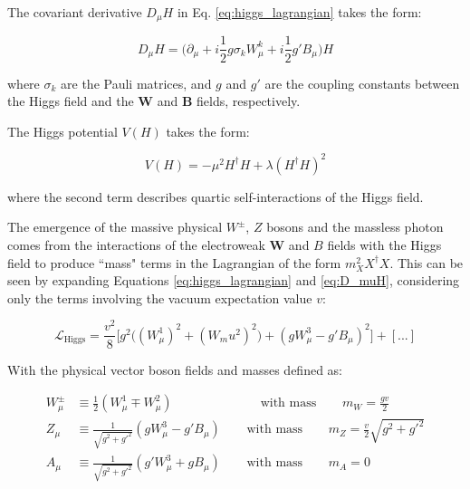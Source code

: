 The covariant derivative \(D_\mu H\) in Eq. \ref{eq:higgs_lagrangian} takes the form:

\begin{equation}
\label{eq:D_muH}
D_\mu H = \big(\partial_\mu + i\frac{1}{2}g\sigma_k W^k_\mu+i\frac{1}{2}g'B_\mu\big)H
\end{equation}

\noindent where \(\sigma_k\) are the Pauli matrices, and \(g\) and \(g'\) are the coupling constants between the Higgs field and the \(\boldsymbol{W}\) and \(\boldsymbol{B}\) fields, respectively.

The Higgs potential \(V(H)\) takes the form:

\begin{equation}
V(H) = -\mu^2H^\dagger H + \lambda(H^\dagger H)^2
\end{equation}

\noindent where the second term describes quartic self-interactions of the Higgs field.

The emergence of the massive physical \(W^\pm\), \(Z\) bosons and the massless photon comes from the interactions of the electroweak \(\boldsymbol{W}\) and \(B\) fields with the Higgs field to produce ``mass" terms in the Lagrangian of the form \(m_X^2X^\dagger X\). This can be seen by expanding Equations \ref{eq:higgs_lagrangian} and  \ref{eq:D_muH}, considering only the terms involving the vacuum expectation value \(v\):

\begin{equation}
\label{eq:higgs_expanded}
\mathcal{L}_\text{Higgs} = \frac{v^2}{8}\Big[g^2\big((W^1_\mu)^2+(W_mu^2)^2\big) + (gW^3_\mu-g'B_\mu)^2\Big] + [...]
\end{equation}

With the physical vector boson fields and masses defined as:

\begin{equation}
\label{eq:physical_v_bosons}
\begin{split}
W^\pm_\mu & \equiv \frac{1}{2}(W_\mu^1 \mp W_\mu^2) \phantom{xxxxxxxxxlxx}\text{ with mass }\phantom{xxx} m_W=\frac{gv}{2} \\
Z_\mu & \equiv \frac{1}{\sqrt{g^2+g'^2}}(gW_\mu^3-g'B_\mu) \phantom{xxx}\text{ with mass }\phantom{xxx} m_Z = \frac{v}{2}\sqrt{g^2+g'^2} \\
A_\mu & \equiv \frac{1}{\sqrt{g^2+g'^2}}(g'W^3_\mu+gB_\mu) \phantom{xxx}\text{ with mass }\phantom{xxx} m_A = 0
\end{split}
\end{equation}

